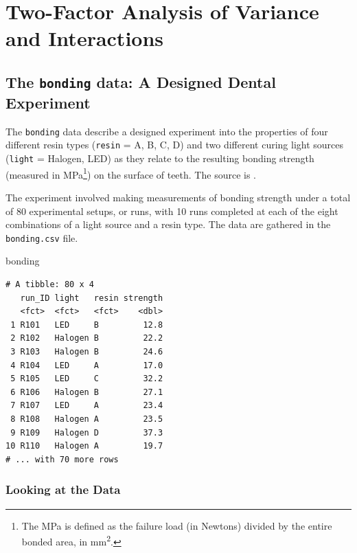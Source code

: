 \documentclass[]{book}
\newenvironment{Shaded}{\begin{snugshade}}{\end{snugshade}}
\newcommand{\NormalTok}[1]{#1}
\let\rmarkdownfootnote\footnote%
\def\footnote{\protect\rmarkdownfootnote}
\theoremstyle{definition}
\theoremstyle{definition}
\theoremstyle{definition}
\theoremstyle{remark}
\begin{document}
\chapter{Two-Factor Analysis of Variance and
Interactions}\label{two-factor-analysis-of-variance-and-interactions}

\section{\texorpdfstring{The \texttt{bonding} data: A Designed Dental
Experiment}{The bonding data: A Designed Dental Experiment}}\label{the-bonding-data-a-designed-dental-experiment}

The \texttt{bonding} data describe a designed experiment into the
properties of four different resin types (\texttt{resin} = A, B, C, D)
and two different curing light sources (\texttt{light} = Halogen, LED)
as they relate to the resulting bonding strength (measured in
MPa\footnote{The MPa is defined as the failure load (in Newtons) divided
  by the entire bonded area, in mm\textsuperscript{2}.}) on the surface
of teeth. The source is \citet{Kim2014}.

The experiment involved making measurements of bonding strength under a
total of 80 experimental setups, or runs, with 10 runs completed at each
of the eight combinations of a light source and a resin type. The data
are gathered in the \texttt{bonding.csv} file.

\begin{Shaded}
\begin{Highlighting}[]
\NormalTok{bonding}
\end{Highlighting}
\end{Shaded}

\begin{verbatim}
# A tibble: 80 x 4
   run_ID light   resin strength
   <fct>  <fct>   <fct>    <dbl>
 1 R101   LED     B         12.8
 2 R102   Halogen B         22.2
 3 R103   Halogen B         24.6
 4 R104   LED     A         17.0
 5 R105   LED     C         32.2
 6 R106   Halogen B         27.1
 7 R107   LED     A         23.4
 8 R108   Halogen A         23.5
 9 R109   Halogen D         37.3
10 R110   Halogen A         19.7
# ... with 70 more rows
\end{verbatim}

\subsection{Looking at the Data}\label{looking-at-the-data}
\end{document}
